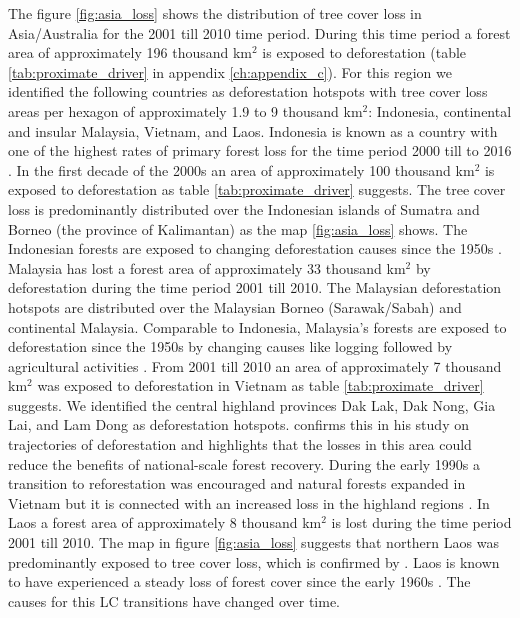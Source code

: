 			The figure \ref{fig:asia_loss} shows the distribution of tree cover loss in Asia/Australia for the 2001 till 2010 time period. During this time period a forest area of approximately 196 thousand km$^2$ is exposed to deforestation (table \ref{tab:proximate_driver} in appendix \ref{ch:appendix_c}). For this region we identified the following countries as deforestation hotspots with tree cover loss areas per hexagon of approximately 1.9 to 9 thousand km$^2$: Indonesia, continental and insular Malaysia, Vietnam, and Laos. Indonesia is known as a country with one of the highest rates of primary forest loss for the time period 2000 till to 2016 \citep{Austin2019}. In the first decade of the 2000s an area of approximately 100 thousand km$^2$ is exposed to deforestation as table \ref{tab:proximate_driver} suggests. The tree cover loss is predominantly distributed over the Indonesian islands of Sumatra and Borneo (the province of Kalimantan) as the map \ref{fig:asia_loss} shows. The Indonesian forests are exposed to changing deforestation causes since the 1950s \citep{Nawir2007}. Malaysia has lost a forest area of approximately 33 thousand km$^2$ by deforestation during the time period 2001 till 2010. The  Malaysian deforestation hotspots are distributed over the Malaysian Borneo (Sarawak/Sabah) and continental Malaysia. Comparable to Indonesia, Malaysia's forests are exposed to deforestation since the 1950s by changing causes like logging followed by agricultural activities \citep{Kummer1994}. From 2001 till 2010 an area of approximately 7 thousand km$^2$ was exposed to deforestation in Vietnam as table \ref{tab:proximate_driver} suggests. We identified the central highland provinces Dak Lak, Dak Nong, Gia Lai, and Lam Dong as deforestation hotspots. \citet{Meyfroidt2013} confirms this in his study on trajectories of deforestation and highlights that the losses in this area could reduce the benefits of national-scale forest recovery. During the early 1990s a transition to reforestation was encouraged and natural forests expanded in Vietnam but it is connected with an increased loss in the highland regions \citep{Meyfroidt2013,Chazdon2008}. In Laos a forest area of approximately 8 thousand km$^2$ is lost during the time period 2001 till 2010. The map in figure \ref{fig:asia_loss} suggests that northern Laos was predominantly exposed to tree cover loss, which is confirmed by \citet{Hirsch2000}. Laos is known to have experienced a steady loss of forest cover since the early 1960s \citep{Hirsch2000}. The causes for this \ac{LC} transitions have changed over time.
